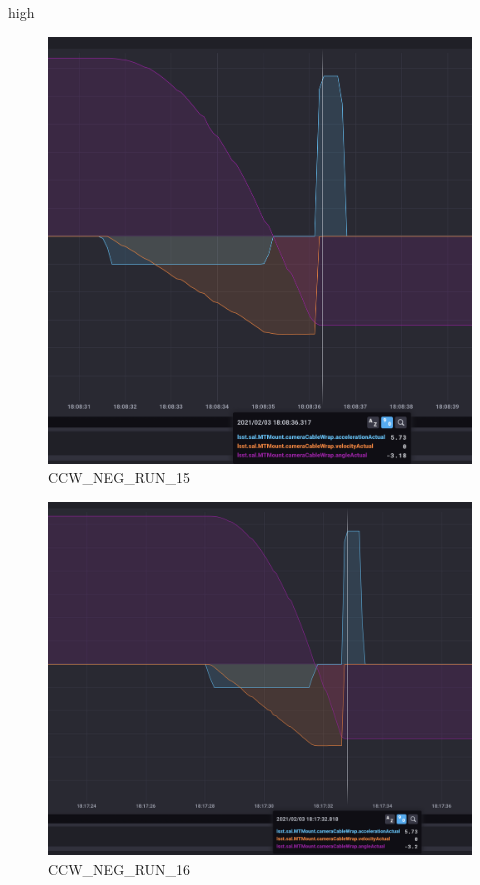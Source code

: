 high\documentclass[SE,lsstdraft,authoryear,toc]{lsstdoc}
\begin{document}
\begin{figure}[h!]
  \includegraphics[width=\linewidth]{media/CCW_design_speed_neg_test15.png}
  \caption{CCW\_NEG\_RUN\_15}
  \label{fig:CCW_NEG_RUN_15}
\end{figure}
\begin{figure}[h!]
  \includegraphics[width=\linewidth]{media/CCW_design_speed_neg_test16.png}
  \caption{CCW\_NEG\_RUN\_16}
  \label{fig:CCW_NEG_RUN_16}
\end{figure}
\end{document}
